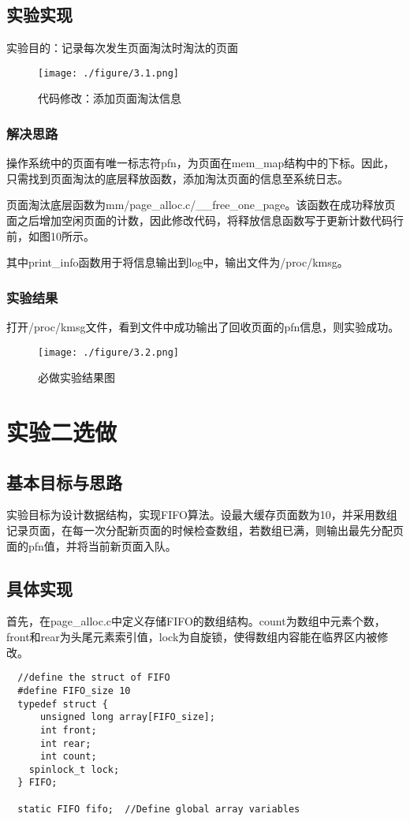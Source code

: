 \documentclass[11pt, a4paper, oneside,UTF8]{ctexart}
\begin{document}
\subsection{实验实现}

实验目的：记录每次发生页面淘汰时淘汰的页面

\begin{figure}[ht]
  \centering
  \texttt{[image: ./figure/3.1.png]}
  \caption{代码修改：添加页面淘汰信息}
  \label{figure:3.1}
\end{figure}

\subsubsection{解决思路}
操作系统中的页面有唯一标志符pfn，为页面在mem\_map结构中的下标。因此，只需找到页面淘汰的底层释放函数，添加淘汰页面的信息至系统日志。

页面淘汰底层函数为mm/page\_alloc.c/\_\_free\_one\_page。该函数在成功释放页面之后增加空闲页面的计数，因此修改代码，将释放信息函数写于更新计数代码行前，如图10所示。

其中print\_info函数用于将信息输出到log中，输出文件为/proc/kmsg。

\subsubsection{实验结果}

打开/proc/kmsg文件，看到文件中成功输出了回收页面的pfn信息，则实验成功。
\begin{figure}[ht]
  \centering
  \texttt{[image: ./figure/3.2.png]}
  \caption{必做实验结果图}
  \label{figure:3.2}
\end{figure}

\section{\textbf{实验二选做}}

\subsection{基本目标与思路}
实验目标为设计数据结构，实现FIFO算法。设最大缓存页面数为10，并采用数组记录页面，在每一次分配新页面的时候检查数组，若数组已满，则输出最先分配页面的pfn值，并将当前新页面入队。

\subsection{具体实现}
首先，在page\_alloc.c中定义存储FIFO的数组结构。count为数组中元素个数，front和rear为头尾元素索引值，lock为自旋锁，使得数组内容能在临界区内被修改。
\begin{lstlisting}
  //define the struct of FIFO
  #define FIFO_size 10
  typedef struct {
      unsigned long array[FIFO_size];
      int front;
      int rear;
      int count;
    spinlock_t lock;
  } FIFO;

  static FIFO fifo;  //Define global array variables
\end{lstlisting}
\end{document}
